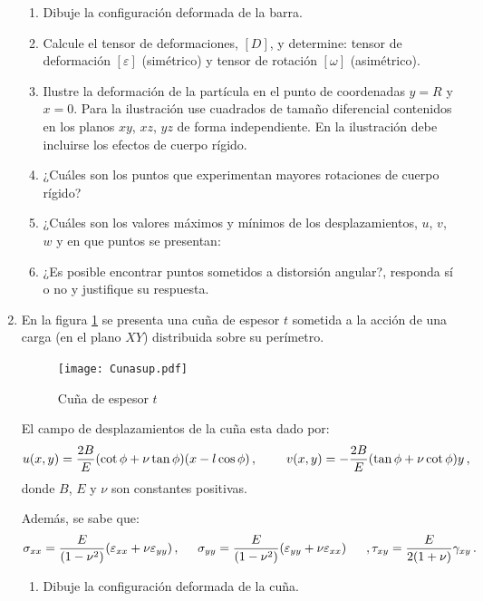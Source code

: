 \documentclass[../notas medios.tex]{subfiles}
\begin{document}
\begin{enumerate}
\begin{enumerate}
\item Dibuje la configuración deformada de la barra. 
\item Calcule el tensor de deformaciones, $[D]$, y determine: tensor de 
deformación $[\varepsilon]$ (simétrico) y tensor de rotación $[\omega]$ 
(asimétrico).
\item Ilustre la deformación de la partícula en el punto de coordenadas $y = R$ 
y $x = 0$. Para la ilustración use cuadrados de tamaño diferencial contenidos 
en los planos $xy$, $xz$, $yz$ de forma independiente. En la ilustración debe 
incluirse los efectos de cuerpo rígido.
\item ¿Cuáles son los puntos que experimentan mayores rotaciones de cuerpo 
rígido?
\item ¿Cuáles son los valores máximos y mínimos de los desplazamientos, $u$, 
$v$, $w$ y en que puntos se presentan:
\item  ¿Es posible encontrar puntos sometidos a distorsión 
angular?, responda sí o no y justifique su respuesta.
\end{enumerate}

\item  \label{punto09_d} En la figura \cref{cuna} se presenta una cuña de 
espesor $t$ sometida a la acción de una carga (en el plano $XY$) distribuida 
sobre su perímetro.
%
\begin{figure}[H]
	\centering
	{\texttt{[image: Cunasup.pdf]}}\
	\hspace{2 cm}
	\caption{Cuña de espesor $t$}
	\label{cuna}
\end{figure}
%
El campo de desplazamientos de la cuña  esta dado por:
\[u(x,y) = \dfrac{2B}{E} (\cot \phi + \nu \tan \phi) (x - l\cos \phi)\, ,
\hspace{8mm}  v(x,y) = - \dfrac{2B}{E} (\tan \phi + \nu \cot \phi) y\, ,\]
donde $B$, $E$ y $\nu$ son constantes positivas.

Además, se sabe que:
\[ \sigma_{xx} = \dfrac{E}{(1 - \nu^2)} (\varepsilon_{xx} + \nu 
\varepsilon_{yy})\, ,\hspace{5mm}
\sigma_{yy} = \dfrac{E}{(1 - \nu^2)} (\varepsilon_{yy} + \nu \varepsilon_{xx}) 
\hspace{5mm}\, ,
\tau_{xy} = \dfrac{E}{2(1 + \nu)} \gamma_{xy}\, .\]

\begin{enumerate}
\item Dibuje la configuración deformada de la cuña. 


\end{enumerate}
\end{enumerate}
\end{document}
